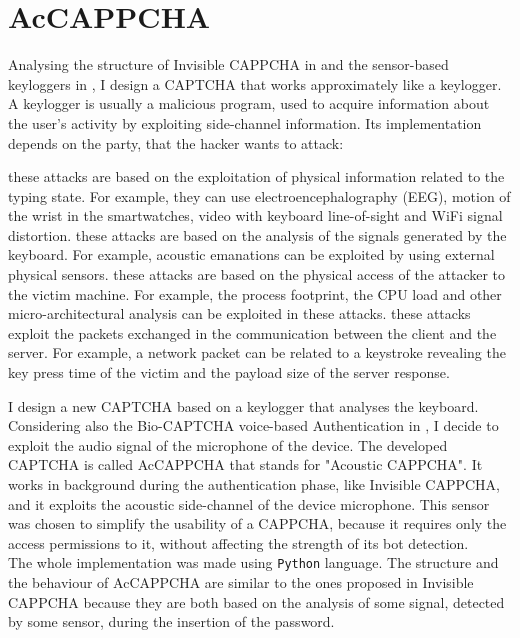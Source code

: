 \chapter{AcCAPPCHA}\label{chapter:AcCAPPCHA}
Analysing the structure of Invisible CAPPCHA in  and the sensor-based keyloggers in , I design a CAPTCHA that works approximately like a keylogger. A keylogger is usually a malicious program, used to acquire information about the user's activity by exploiting side-channel information. Its implementation depends on the party, that the hacker wants to attack\cite{keylogging}:
\begin{itemize}
{these attacks are based on the exploitation of physical information related to the typing state. For example, they can use electroencephalography (EEG), motion of the wrist in the smartwatches, video with keyboard line-of-sight and WiFi signal distortion.}
{these attacks are based on the analysis of the signals generated by the keyboard. For example, acoustic emanations can be exploited by using external physical sensors.}
{these attacks are based on the physical access of the attacker to the victim machine. For example, the process footprint, the CPU load and other micro-architectural analysis can be exploited in these attacks.}
{these attacks exploit the packets exchanged in the communication between the client and the server. For example, a network packet can be related to a keystroke revealing the key press time of the victim and the payload size of the server response.}
\end{itemize}
I design a new CAPTCHA based on a keylogger that analyses the keyboard. Considering also the Bio-CAPTCHA voice-based Authentication in , I decide to exploit the audio signal of the microphone of the device. The developed CAPTCHA is called AcCAPPCHA that stands for "Acoustic CAPPCHA". It works in background during the authentication phase, like Invisible CAPPCHA, and it exploits the acoustic side-channel of the device microphone.
This sensor was chosen to simplify the usability of a CAPPCHA, because it requires only the access permissions to it, without affecting the strength of its bot detection.\\
The whole implementation was made using \texttt{Python} language. The structure and the behaviour of AcCAPPCHA are similar to the ones proposed in Invisible CAPPCHA because they are both based on the analysis of some signal, detected by some sensor, during the insertion of the password.\\
